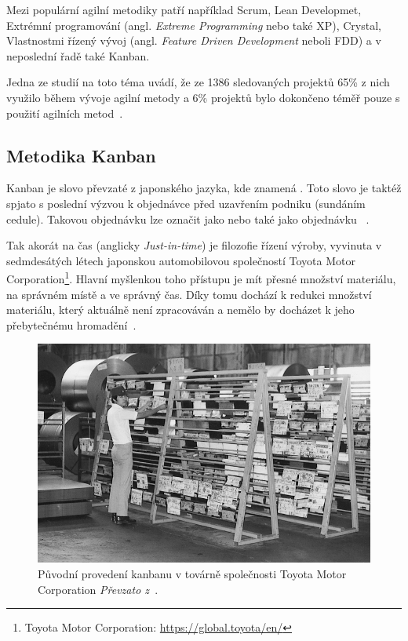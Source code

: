 Mezi populární agilní metodiky patří například Scrum, Lean Developmet, Extrémní programování (angl. \emph{Extreme Programming} nebo také XP), Crystal, Vlastnostmi řízený vývoj (angl. \emph{Feature Driven Development} neboli FDD) a v neposlední řadě také Kanban.

\blindtext %

\blindtext %

Jedna ze studií na toto téma uvádí, že ze 1386 sledovaných projektů 65\% z nich využilo během vývoje agilní metody a 6\% projektů bylo dokončeno téměř pouze s použití agilních metod~\cite{bib:agile-work}. %

\subsection{Metodika Kanban}
Kanban je slovo převzaté z japonského jazyka, kde znamená . Toto slovo je taktéž spjato s poslední výzvou k objednávce před uzavřením podniku (sundáním cedule). Takovou objednávku lze označit jako  nebo také jako objednávku ~\cite{bib:dict-kanban}. 

Tak akorát na čas (anglicky \emph{Just-in-time}) je filozofie řízení výroby, vyvinuta v sedmdesátých létech japonskou automobilovou společností Toyota Motor Corporation\footnote{Toyota Motor Corporation: \url{https://global.toyota/en/}}. Hlavní myšlenkou toho přístupu je mít přesné množství materiálu, na správném místě a ve správný čas. Díky tomu dochází k redukci množství materiálu, který aktuálně není zpracováván a nemělo by docházet k jeho přebytečnému hromadění~\cite{bib:just-in-time}.

\begin{figure}[H]
	\centering
	\includegraphics[width=\textwidth]{obrazky-figures/toyota-kanban.jpg}
	\caption{Původní provedení kanbanu v továrně společnosti Toyota Motor Corporation \emph{Převzato z~\cite{bib:toyota-history}}.}
\end{figure}

